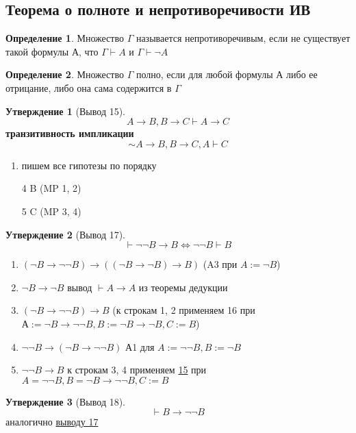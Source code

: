 \documentclass[a4paper]{article}
\theoremstyle{definition}
\newtheorem*{definition}{Определение}
\newtheorem*{statement}{Утверждение}
\theoremstyle{remark}
\begin{document}
    \subsection{Теорема о полноте и непротиворечивости ИВ}
    \begin{definition}
        Множество $\Gamma$ называется непротиворечивым, если не существует
        такой формулы А, что $\Gamma \vdash A$ и $\Gamma \vdash \neg A$
    \end{definition}
    \begin{definition}
        Множество $\Gamma$ полно, если для любой формулы А либо ее отрицание, либо она сама содержится в $\Gamma$
    \end{definition}
    \begin{statement}[\hypertarget{Вывод 15}{Вывод 15}]
        $$A\to B, B\to C\vdash A\to C$$
        \textbf{транзитивность импликации}
        $$\sim A\to B, B\to C, A\vdash C $$
        \begin{enumerate}
            \item пишем все гипотезы по порядку
            \item[4] B (MP 1, 2)
            \item[5] C (MP 3, 4)
        \end{enumerate}
    \end{statement}
    \begin{statement}[\hypertarget{Вывод 17}{Вывод 17}]
        $$\vdash \neg \neg B \to B \Leftrightarrow \neg \neg B\vdash B$$
        \begin{enumerate}
            \item $(\neg B\to \neg \neg B)\to ((\neg B \to \neg B)\to B)$ (A3 при $A:=\neg B$)
            \item $\neg B \to \neg B$ вывод $\vdash A\to A$ из теоремы дедукции
            \item $(\neg B\to \neg \neg B) \to B$ (к строкам 1, 2 применяем 16 при $А:=\neg B \to \neg \neg B, B:=\neg B \to \neg B, C:=B$)
            \item $\neg \neg B \to (\neg B \to \neg \neg B) $ А1 для $A := \neg \neg B, B := \neg B$
            \item $\neg \neg B \to B$ к строкам 3, 4 применяем \hyperlink{Вывод 15}{15} при $A = \neg \neg B, B = \neg B \to \neg \neg B, C :=B$
        \end{enumerate}
    \end{statement}
    \begin{statement}[\hypertarget{Вывод 18}{Вывод 18}]
        $$\vdash B\to \neg \neg B$$
        аналогично \hyperlink{Вывод 17}{выводу 17}
    \end{statement}
\end{document}
